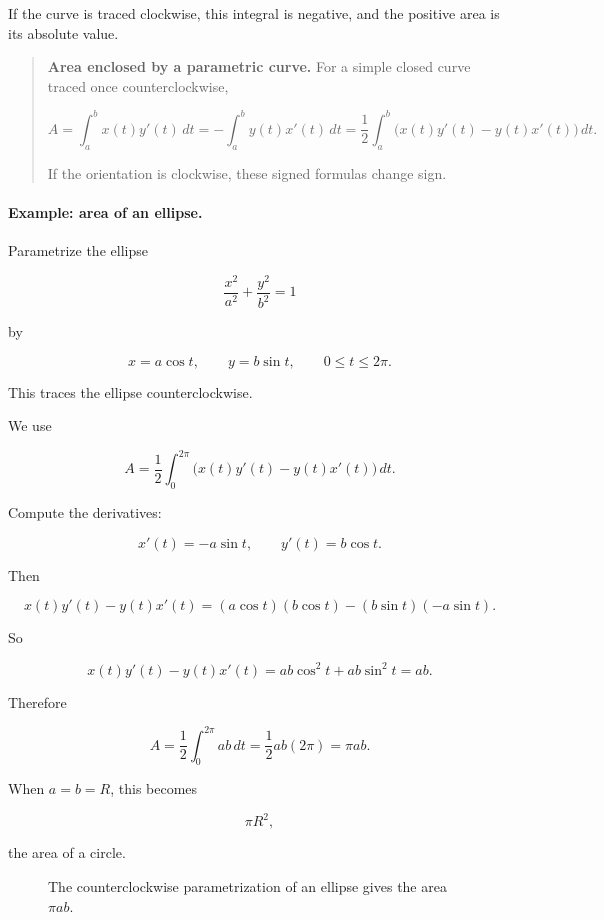 If the curve is traced clockwise, this integral is negative, and the positive area is its
absolute value.

\begin{quote}
\textbf{Area enclosed by a parametric curve.}
For a simple closed curve traced once counterclockwise,

\[
\boxed{
A=
\int_a^b x(t)y'(t)\,dt
=
-\int_a^b y(t)x'(t)\,dt
=
\frac12\int_a^b
\bigl(x(t)y'(t)-y(t)x'(t)\bigr)\,dt.
}
\]

If the orientation is clockwise, these signed formulas change sign.
\end{quote}

\paragraph{Example: area of an ellipse.}
Parametrize the ellipse

\[
\frac{x^2}{a^2}+\frac{y^2}{b^2}=1
\]

by

\[
x=a\cos t,
\qquad
y=b\sin t,
\qquad
0\le t\le2\pi.
\]

This traces the ellipse counterclockwise.

We use

\[
A=
\frac12\int_0^{2\pi}
\bigl(x(t)y'(t)-y(t)x'(t)\bigr)\,dt.
\]

Compute the derivatives:

\[
x'(t)=-a\sin t,
\qquad
y'(t)=b\cos t.
\]

Then

\[
x(t)y'(t)-y(t)x'(t)
=
(a\cos t)(b\cos t)-(b\sin t)(-a\sin t).
\]

So

\[
x(t)y'(t)-y(t)x'(t)
=
ab\cos^2t+ab\sin^2t
=
ab.
\]

Therefore

\[
A=
\frac12\int_0^{2\pi} ab\,dt
=
\frac12 ab(2\pi)
=
\boxed{\pi ab}.
\]

When \(a=b=R\), this becomes

\[
\pi R^2,
\]

the area of a circle.

\begin{figure}[h]
\centering
{}
\caption{The counterclockwise parametrization of an ellipse gives the area \(\pi ab\).}
\label{fig:parametric-ellipse-area}
\end{figure}

